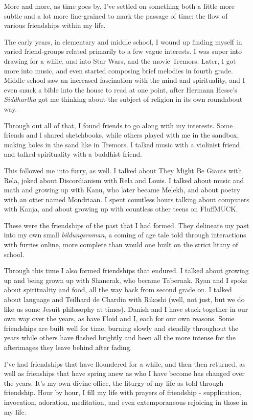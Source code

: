 More and more, as time goes by, I've settled on something both a little
more subtle and a lot more fine-grained to mark the passage of time: the
flow of various friendships within my life.

The early years, in elementary and middle school, I wound up finding
myself in varied friend-groups related primarily to a few vague
interests. I was super into drawing for a while, and into Star Wars, and
the movie Tremors. Later, I got more into music, and even started
composing brief melodies in fourth grade. Middle school saw an increased
fascination with the mind and spirituality, and I even snuck a bible
into the house to read at one point, after Hermann Hesse's
\emph{Siddhartha} got me thinking about the subject of religion in its
own roundabout way.

Through out all of that, I found friends to go along with my interests.
Some friends and I shared sketchbooks, while others played with me in
the sandbox, making holes in the sand like in Tremors. I talked music
with a violinist friend and talked spirituality with a buddhist friend.

This followed me into furry, as well. I talked about They Might Be
Giants with Rela, joked about Discordianism with Rela and Louis. I
talked about music and math and growing up with Kanu, who later became
Melekh, and about poetry with an otter named Mondriaan. I spent
countless hours talking about computers with Kanja, and about growing up
with countless other teens on FluffMUCK.

These were the friendships of the past that I had formed. They delineate
my past into my own small \emph{bildungsroman}, a coming of age tale
told through interactions with furries online, more complete than would
one built on the strict litany of school.

Through this time I also formed friendships that endured. I talked about
growing up and being grown up with Shanerak, who became Tabernak. Ryan
and I spoke about spirituality and food, all the way back from second
grade on. I talked about language and Teilhard de Chardin with Rikoshi
(well, not just, but we do like us some Jesuit philosophy at times).
Danish and I have stuck together in our own way over the years, as have
Floid and I, each for our own reasons. Some friendships are built well
for time, burning slowly and steadily throughout the years while others
have flashed brightly and been all the more intense for the afterimages
they leave behind after fading.

I've had friendships that have floundered for a while, and then then
returned, as well as frienships that have spring anew as who I have
become has changed over the years. It's my own divine office, the
liturgy of my life as told through friendship. Hour by hour, I fill my
life with prayers of friendship - supplication, invocation, adoration,
meditation, and even extemporaneous rejoicing in those in my life.

